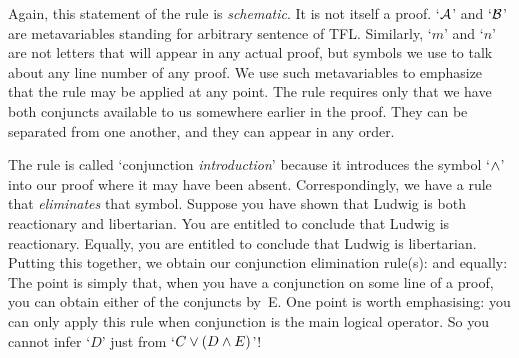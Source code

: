 Again, this statement of the rule is \emph{schematic}. It is not
itself a proof. `$\mathcal{A}$' and `$\mathcal{B}$' are metavariables
standing for arbitrary sentence of TFL. Similarly, `$m$' and `$n$' are
not letters that will appear in any actual proof, but symbols we use
to talk about any line number of any proof. We use such metavariables to
emphasize that the rule may be applied at any point. The rule requires
only that we have both conjuncts available to us somewhere earlier in
the proof. They can be separated from one another, and they can appear
in any order.

The rule is called `conjunction \emph{introduction}' because it introduces the symbol `$\wedge$' into our proof where it may have been absent. Correspondingly, we have a rule that \emph{eliminates} that symbol.  Suppose you have shown that Ludwig is both reactionary and libertarian. You are entitled to conclude that Ludwig is reactionary. Equally, you are entitled to conclude that Ludwig is libertarian. Putting this together, we obtain our conjunction elimination rule(s):
and equally:
The point is simply that, when you have a conjunction on some line of a proof, you can obtain either of the conjuncts by~{\eand}E. One point is worth emphasising: you can only apply this rule when conjunction is the main logical operator. So you cannot infer `$D$' just from `$C \vee (D \wedge E)$'!

